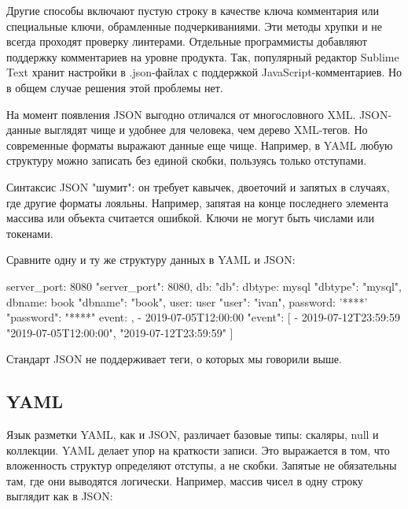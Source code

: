 Другие способы включают пустую строку в качестве ключа комментария или
специальные ключи, обрамленные подчеркиваниями. Эти методы хрупки и не всегда
проходят проверку линтерами. Отдельные программисты добавляют поддержку
комментариев на уровне продукта. Так, популярный редактор Sublime Text хранит
настройки в .json-файлах с поддержкой JavaScript-комментариев. Но в общем случае
решения этой проблемы нет.

На момент появления JSON выгодно отличался от многословного XML. JSON-данные
выглядят чище и удобнее для человека, чем дерево XML-тегов. Но современные
форматы выражают данные еще чище. Например, в YAML любую структуру можно
записать без единой скобки, пользуясь только отступами.

Синтаксис JSON "шумит": он требует кавычек, двоеточий и запятых в случаях, где
другие форматы лояльны. Например, запятая на конце последнего элемента массива
или объекта считается ошибкой. Ключи не могут быть числами или
токенами.

Сравните одну и ту же структуру данных в YAML и JSON:

\begin{code}
                              {
server_port: 8080                  "server_port": 8080,
db:                                "db": {
  dbtype:   mysql                      "dbtype":   "mysql",
  dbname:   book                       "dbname":   "book",
  user:     user                       "user":     "ivan",
  password: '****'                     "password": "****"
event:                             },
  - 2019-07-05T12:00:00            "event": [
  - 2019-07-12T23:59:59                "2019-07-05T12:00:00",
                                       "2019-07-12T23:59:59"
                                   ]
                               }
\end{code}

Стандарт JSON не поддерживает теги, о которых мы говорили выше.

\subsection{YAML}

Язык разметки YAML, как и JSON, различает базовые типы: скаляры, null и
коллекции. YAML делает упор на краткости записи. Это выражается в том, что
вложенность структур определяют отступы, а не скобки. Запятые не обязательны
там, где они выводятся логически. Например, массив чисел в одну строку выглядит
как в JSON:

